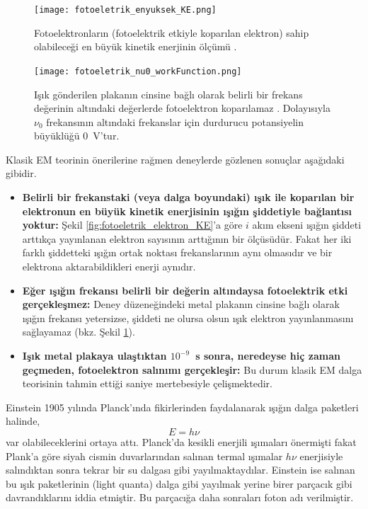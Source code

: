 \documentclass[a4paper,12pt, twoside]{article}
\begin{document}
\begin{figure}[hbtp]
\center
\begin{minipage}{0.45\textwidth}
\texttt{[image: fotoeletrik\_enyuksek\_KE.png]}
\caption{Fotoelektronların (fotoelektrik etkiyle koparılan elektron) sahip olabileceği en büyük kinetik enerjinin ölçümü \cite{book:EisbergResnick}.}
\label{fig:fotoeletrik_elektron_KE}
\end{minipage}
\hspace{24pt}
\begin{minipage}{0.45\textwidth}
\texttt{[image: fotoeletrik\_nu0\_workFunction.png]}
\caption{Işık gönderilen plakanın cinsine bağlı olarak belirli bir frekans değerinin altındaki değerlerde fotoelektron koparılamaz \cite{book:EisbergResnick}. Dolayısıyla $\nu_0$ frekansının altındaki frekanslar için durdurucu potansiyelin büyüklüğü $0$~V'tur.}
\label{fig:fotoeletrik_workfunction}
\end{minipage}
\end{figure}

Klasik EM teorinin önerilerine rağmen deneylerde gözlenen sonuçlar aşağıdaki gibidir.
\begin{itemize}
\item {\bf Belirli bir frekanstaki (veya dalga boyundaki) ışık ile koparılan bir elektronun en büyük kinetik enerjisinin ışığın şiddetiyle bağlantısı yoktur:} Şekil \ref{fig:fotoeletrik_elektron_KE}'a göre $i$ akım ekseni ışığın şiddeti arttıkça yayınlanan elektron sayısının arttığının bir ölçüsüdür. Fakat her iki farklı şiddetteki ışığın ortak noktası frekanslarının aynı olmasıdır ve bir elektrona aktarabildikleri enerji aynıdır.

\item {\bf Eğer ışığın frekansı belirli bir değerin altındaysa fotoelektrik etki gerçekleşmez:} Deney düzeneğindeki metal plakanın cinsine bağlı olarak ışığın frekansı yetersizse, şiddeti ne olursa olsun ışık elektron yayınlanmasını sağlayamaz (bkz. Şekil \ref{fig:fotoeletrik_workfunction}).

\item {\bf Işık metal plakaya ulaştıktan $10^{-9}$~s sonra, neredeyse hiç zaman geçmeden, fotoelektron salınımı gerçekleşir:} Bu durum klasik EM dalga teorisinin tahmin ettiği saniye mertebesiyle çelişmektedir.

\end{itemize}

Einstein 1905 yılında Planck'ında fikirlerinden faydalanarak ışığın dalga paketleri halinde,
\begin{equation}
\label{eq:photon_E}
E = h\nu
\end{equation}
var olabileceklerini ortaya attı. Planck'da kesikli enerjili ışımaları önermişti fakat Plank'a göre siyah cismin duvarlarından salınan termal ışımalar $h\nu$  enerjisiyle salındıktan sonra tekrar bir su dalgası gibi yayılmaktaydılar. Einstein ise salınan bu ışık paketlerinin (light quanta) dalga gibi yayılmak yerine birer parçacık gibi davrandıklarını iddia etmiştir. Bu parçacığa daha sonraları foton adı verilmiştir.
\end{document}
